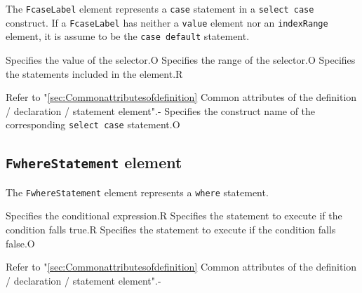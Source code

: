The {\tt FcaseLabel} element represents a {\tt case} statement in a {\tt select case} construct.
If a {\tt FcaseLabel} has neither a {\tt value} element nor an {\tt indexRange} element, it is assume to be the {\tt case default} statement.


\begin{XcodeMLChildElements}
{Specifies the value of the selector.}{O}
{Specifies the range of the selector.}{O}
{Specifies the statements included in the element.}{R}
\end{XcodeMLChildElements}

\begin{XcodeMLAttributes}
{Refer to "\ref{sec:Commonattributesofdefinition} Common attributes of the definition / declaration / statement element".}{-}
{Specifies the construct name of the corresponding {\tt select case} statement.}{O}
\end{XcodeMLAttributes}


\subsection{ {\tt FwhereStatement} element}

The {\tt FwhereStatement} element represents a {\tt where} statement.


\begin{XcodeMLChildElements}
{Specifies the conditional expression.}{R}
{Specifies the statement to execute if the condition falls true.}{R}
{Specifies the statement to execute if the condition falls false.}{O}
\end{XcodeMLChildElements}

\begin{XcodeMLAttributes}
{Refer to "\ref{sec:Commonattributesofdefinition} Common attributes of the definition / declaration / statement element".}{-}
\end{XcodeMLAttributes}


